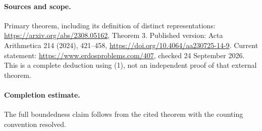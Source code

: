 \paragraph{Sources and scope.}
Primary theorem, including its definition of distinct representations:
\url{https://arxiv.org/abs/2308.05162}, Theorem 3.
Published version: Acta Arithmetica 214 (2024), 421--458,
\url{https://doi.org/10.4064/aa230725-14-9}.
Current statement: \url{https://www.erdosproblems.com/407},
checked 24 September 2026. This is a complete deduction using (1),
not an independent proof of that external theorem.

\paragraph{Completion estimate.}
The full boundedness claim follows from the cited theorem with the counting convention resolved.
